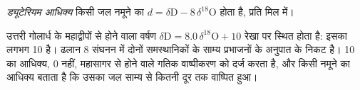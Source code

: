 \begin{definition}[ड्यूटेरियम आधिक्य]\label{def:b3:stable-isotopes:d-excess}
\emph{ड्यूटेरियम आधिक्य} किसी जल नमूने का $d =
\delta\mathrm D - 8\,\delta^{18}\mathrm O$ होता है, प्रति मिल में।
\end{definition}

उत्तरी गोलार्ध के महाद्वीपों से होने वाला वर्षण
$\delta\mathrm D = 8.0\,\delta^{18}\mathrm O + 10$ रेखा पर स्थित होता है: इसका  लगभग
\qty{10}{\permil} है। ढलान 8 संघनन में दोनों समस्थानिकों के साम्य
प्रभाजनों के अनुपात के निकट है। 10 का आधिक्य, 0 नहीं,
महासागर से होने वाले गतिक वाष्पीकरण को दर्ज करता है, और किसी नमूने का आधिक्य
बताता है कि उसका जल साम्य से कितनी दूर तक वाष्पित हुआ।

